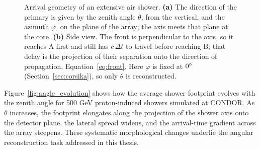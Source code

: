 \begin{figure}[ht!]
\caption[Arrival geometry of an extensive air shower.]{Arrival geometry of an extensive air shower. \textbf{(a)} The direction of the primary is given by the zenith angle $\theta$, from the vertical, and the azimuth $\varphi$, on the plane of the array; the axis meets that plane at the core. \textbf{(b)} Side view. The front is perpendicular to the axis, so it reaches A first and still has $c\,\Delta t$ to travel before reaching B; that delay is the projection of their separation onto the direction of propagation, Equation~\ref{eq:front}. Here $\varphi$ is fixed at $0\degree$ (Section~\ref{sec:corsika}), so only $\theta$ is reconstructed.}
\label{fig:shower_geometry}
\end{figure}

Figure~\ref{fig:angle_evolution} shows how the average shower footprint evolves with the zenith angle for 500 GeV proton-induced showers simulated at CONDOR. As $\theta$ increases, the footprint elongates along the projection of the shower axis onto the detector plane, the lateral spread widens, and the arrival-time gradient across the array steepens. These systematic morphological changes underlie the angular reconstruction task addressed in this thesis.

